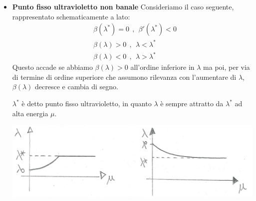 \documentclass[../main.tex]{subfiles}
\begin{document}
\begin{itemize}
    \item \textbf{Punto fisso ultravioletto non banale}
    Consideriamo il caso seguente, rappresentato schematicamente a lato:
    \begin{align*}
        &\beta(\lambda^\ast) = 0 ~~,~~ \beta'(\lambda^\ast)<0 \\
        &\beta(\lambda) > 0 ~~,~~ \lambda < \lambda^\ast \\
        &\beta(\lambda) < 0 ~~,~~ \lambda > \lambda^\ast
    \end{align*}
    Questo accade se abbiamo \(\beta(\lambda) > 0\) all'ordine inferiore in $\lambda$ ma poi, per via di termine di ordine superiore che assumono rilevanza con l'aumentare di $\lambda$, \(\beta(\lambda)\) decresce e cambia di segno.

    $\lambda^\ast$ è detto punto fisso ultravioletto, in quanto $\lambda$ è sempre attratto da $\lambda^\ast$ ad alta energia $\mu$.

    \includegraphics[]{images_ch5/uv_lambdavsmu.jpg}
    

\end{itemize}
\end{document}

